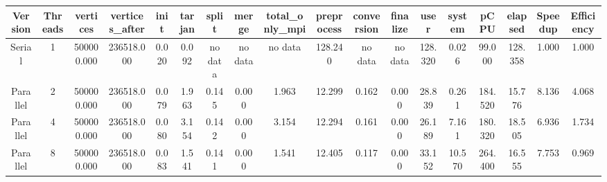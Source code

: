 \begin{tabular}{|c|c|c|c|c|c|c|c|c|c|c|c|c|c|c|c|c|c|}
\toprule
 Version &  Threads &   vertices &  vertices\_after &  init &  tarjan &   split &   merge & total\_only\_mpi &  preprocess & conversion & finalize &    user &  system &    pCPU &  elapsed &  Speedup &  Efficiency \\
\midrule
  Serial &        1 & 500000.000 &      236518.000 & 0.020 &   0.092 & no data & no data &        no data &     128.240 &    no data &  no data & 128.320 &   0.026 &  99.000 &  128.358 &    1.000 &       1.000 \\
Parallel &        2 & 500000.000 &      236518.000 & 0.079 &   1.963 &   0.145 &   0.000 &          1.963 &      12.299 &      0.162 &    0.000 &  28.839 &   0.261 & 184.520 &   15.776 &    8.136 &       4.068 \\
Parallel &        4 & 500000.000 &      236518.000 & 0.080 &   3.154 &   0.142 &   0.000 &          3.154 &      12.294 &      0.161 &    0.000 &  26.189 &   7.161 & 180.320 &   18.505 &    6.936 &       1.734 \\
Parallel &        8 & 500000.000 &      236518.000 & 0.083 &   1.541 &   0.141 &   0.000 &          1.541 &      12.405 &      0.117 &    0.000 &  33.152 &  10.570 & 264.400 &   16.555 &    7.753 &       0.969 \\
\bottomrule
\end{tabular}
